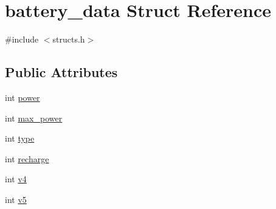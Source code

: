 \hypertarget{structbattery__data}{\section{battery\-\_\-data Struct Reference}
\label{structbattery__data}
}


{\ttfamily \#include $<$structs.\-h$>$}

\subsection*{Public Attributes}
\begin{DoxyCompactItemize}
\item 
int \hyperlink{structbattery__data_aeb2fd557f78d85839b850d7ffd9f3c46}{power}
\item 
int \hyperlink{structbattery__data_ad7b2bab9e7affed36c413eaa3279af39}{max\-\_\-power}
\item 
int \hyperlink{structbattery__data_a519024cb41f6c619235bf7bf439a8918}{type}
\item 
int \hyperlink{structbattery__data_a3daf050843a0b85ac7c60f4ba699d983}{recharge}
\item 
int \hyperlink{structbattery__data_a848dcb38b4ee080b33794822887f789c}{v4}
\item 
int \hyperlink{structbattery__data_a9e9ab46e28e3fcab7b29ed51210b3675}{v5}
\end{DoxyCompactItemize}


